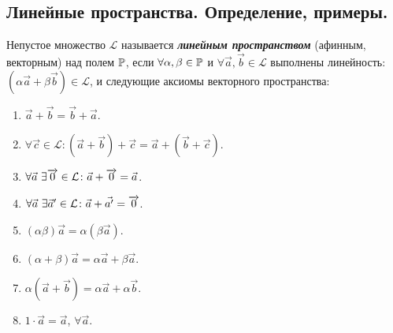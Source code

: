 \subsection{
    Линейные пространства. Определение, примеры.
}

\begin{definition}
    Непустое множество $\mathcal{L}$ называется \textbf{\textit{линейным пространством}} (афинным, векторным) над полем $\mathbb{P}$, если $\forall \alpha, \beta \in \mathbb{P}$ и $\forall \vec{a}, \vec{b} \in \mathcal{L}$ выполнены  линейность:  $(\alpha \vec{a} + \beta \vec{b}) \in \mathcal{L}$, и следующие аксиомы векторного пространства:

    \begin{enumerate}[nosep]
        \item $\vec{a} + \vec{b} = \vec{b} + \vec{a}$.
        \item $\forall \vec{c} \in \mathcal{L} \colon (\vec{a} + \vec{b}) + \vec{c} = \vec{a} + (\vec{b} + \vec{c})$.
        \item $\forall \vec{a} \thinspace \thinspace \exists \overrightarrow{0} \in \mathcal{L} \colon \vec{a} + \overrightarrow{0} = \vec{a}$.
        \item $\forall \vec{a} \thinspace \thinspace \exists \vec{a}' \in \mathcal{L} \colon \vec{a} + \vec{a'} = \overrightarrow{0}$.
        \item $(\alpha \beta) \vec{a} = \alpha(\beta \vec{a})$.
        \item $(\alpha + \beta)\vec{a} = \alpha \vec{a} + \beta \vec{a}$.
        \item $\alpha(\vec{a} + \vec{b}) = \alpha \vec{a} + \alpha \vec{b}$.
        \item $1 \cdot \vec{a} = \vec{a}$, $\forall \vec{a}$.
    \end{enumerate}
\end{definition}


